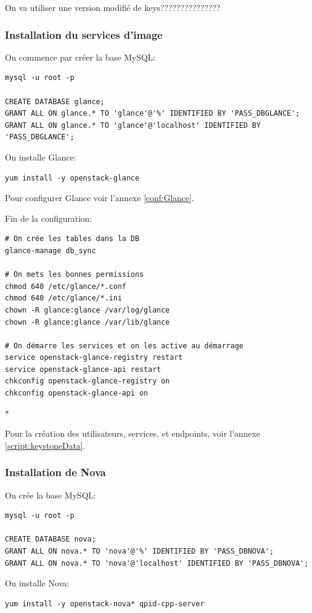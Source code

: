 \documentclass[a4paper,oneside]{report}
\begin{document}
On va utiliser une version modifié de keys???????????????


\subsubsection{Installation du services d'image}
\noindent On commence par créer la base MySQL:
\begin{verbatim}
mysql -u root -p

CREATE DATABASE glance;
GRANT ALL ON glance.* TO 'glance'@'%' IDENTIFIED BY 'PASS_DBGLANCE';
GRANT ALL ON glance.* TO 'glance'@'localhost' IDENTIFIED BY 'PASS_DBGLANCE';
\end{verbatim}

\noindent On installe Glance:
\begin{verbatim}
yum install -y openstack-glance
\end{verbatim}

\noindent Pour configurer Glance voir l'annexe \ref{conf:Glance}.

\noindent Fin de la configuration:
\begin{verbatim}
# On crée les tables dans la DB
glance-manage db_sync

# On mets les bonnes permissions
chmod 640 /etc/glance/*.conf
chmod 640 /etc/glance/*.ini
chown -R glance:glance /var/log/glance
chown -R glance:glance /var/lib/glance

# On démarre les services et on les active au démarrage
service openstack-glance-registry restart
service openstack-glance-api restart
chkconfig openstack-glance-registry on
chkconfig openstack-glance-api on
\end{verbatim}*

\noindent Pour la création des utilisateurs, services, et endpoints, voir l'annexe \ref{script:keystoneData}.

\subsubsection{Installation de Nova}
\noindent On crée la base MySQL:
\begin{verbatim}
mysql -u root -p

CREATE DATABASE nova;
GRANT ALL ON nova.* TO 'nova'@'%' IDENTIFIED BY 'PASS_DBNOVA';
GRANT ALL ON nova.* TO 'nova'@'localhost' IDENTIFIED BY 'PASS_DBNOVA';
\end{verbatim}

\noindent On installe Nova:
\begin{verbatim}
yum install -y openstack-nova* qpid-cpp-server
\end{verbatim}
\end{document}
